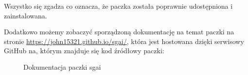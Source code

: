 Wszystko się zgadza co oznacza, że paczka została poprawnie udostępniona i zainstalowana.

Dodatkowo możemy zobaczyć sporządzoną dokumentację na temat paczki na stronie \url{https://john15321.github.io/sgai/}, która jest hostowana dzięki serwisowy GitHub na, którym znajduje się kod źródłowy paczki:


\begin{figure}[h]
    \centering
    \caption{Dokumentacja paczki sgai}
    \label{img:githubdocs}
\end{figure}



